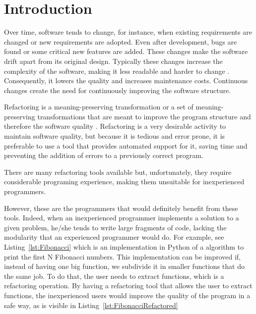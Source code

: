 
%
%


\section{Introduction}
\label{sec:Introduction}

Over time, software tends to change, for instance, when existing requirements are changed or new requirements are adopted.
Even after development, bugs are found or some critical new features are added.
These changes make the software drift apart from its original design.
Typically these changes increase the complexity of the software, making it less readable and harder to change \cite{mens2003refactoring}.
Consequently, it lowers the quality and increases maintenance costs.
Continuous changes create the need for continuously improving the software structure.

Refactoring is a meaning-preserving transformation or a set of meaning-preserving transformations that are meant to improve the program structure and therefore the software quality \cite{bourquin2007high}.
Refactoring is a very desirable activity to maintain software quality, but because it is tedious and error prone, it is preferable to use a tool that provides automated support for it, saving time and preventing the addition of errors to a previously correct program.

%
There are many refactoring tools available but, unfortunately, they require considerable programing experience, making them unsuitable for inexperienced programmers.

However, these are the programmers that would definitely benefit from these tools.
Indeed, when an inexperienced programmer implements a solution to a given problem, he/she tends to write large fragments of code, lacking the modularity that an experienced programmer would do.
For example, see Listing~\ref{lst:Fibonacci} which is an implementation in Python of a algorithm to print the first N Fibonacci numbers.
This implementation can be improved if, instead of having one big function, we subdivide it in smaller functions that do the same job.
To do that, the user needs to extract functions, which is a refactoring operation.
By having a refactoring tool that allows the user to extract functions, the inexperienced users would improve the quality of the program in a safe way, as is visible in Listing~\ref{lst:FibonacciRefactored}



